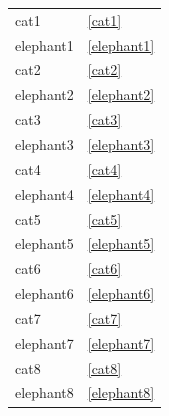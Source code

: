 \documentclass{article}
\begin{document}
\begin{tabular}{ll}
cat1      & \ref{cat1}      \\
elephant1 & \ref{elephant1} \\
cat2      & \ref{cat2}      \\
elephant2 & \ref{elephant2} \\
cat3      & \ref{cat3}      \\
elephant3 & \ref{elephant3} \\
cat4      & \ref{cat4}      \\
elephant4 & \ref{elephant4} \\
cat5      & \ref{cat5}      \\
elephant5 & \ref{elephant5} \\
cat6      & \ref{cat6}      \\
elephant6 & \ref{elephant6} \\
cat7      & \ref{cat7}      \\
elephant7 & \ref{elephant7} \\
cat8      & \ref{cat8}      \\
elephant8 & \ref{elephant8} \\
\end{tabular}
\end{document}
